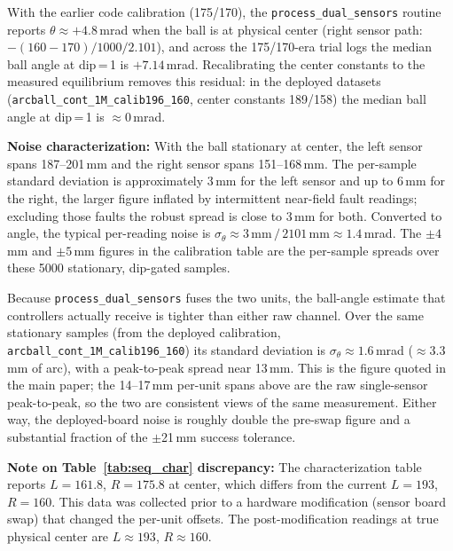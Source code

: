 \noindent
With the earlier code calibration (175/170), the \texttt{process\_dual\_sensors}
routine reports $\theta \approx +4.8$\,mrad when the ball is at physical
center (right sensor path: $-(160-170)/1000/2.101$), and across the
175/170-era trial logs the median ball angle at dip\,=\,1 is $+7.14$\,mrad.
Recalibrating the center constants to the measured equilibrium removes this
residual: in the deployed datasets (\texttt{arcball\_cont\_1M\_calib196\_160},
center constants 189/158) the median ball angle at dip\,=\,1 is
$\approx 0$\,mrad.

\textbf{Noise characterization:}  With the ball stationary at center, the
left sensor spans 187--201\,mm and the right sensor spans
151--168\,mm.  The per-sample standard deviation is
approximately 3\,mm for the left sensor and up to 6\,mm for the right,
the larger figure inflated by intermittent near-field fault readings;
excluding those faults the robust spread is close to 3\,mm for both.
Converted to angle, the typical per-reading noise is
$\sigma_\theta \approx 3\,\text{mm}\, / \,2101\,\text{mm}
\approx 1.4$\,mrad.
The $\pm 4$\,mm and $\pm 5$\,mm figures in the calibration table are the
per-sample spreads over these 5000 stationary, dip-gated samples.

Because \texttt{process\_dual\_sensors} fuses the two units, the ball-angle
estimate that controllers actually receive is tighter than either raw
channel. Over the same stationary samples (from the deployed calibration,
\texttt{arcball\_cont\_1M\_calib196\_160}) its standard deviation is
$\sigma_\theta \approx 1.6$\,mrad ($\approx 3.3$\,mm of arc), with a
peak-to-peak spread near 13\,mm. This is the figure quoted in the main
paper; the 14--17\,mm per-unit spans above are the raw single-sensor
peak-to-peak, so the two are consistent views of the same measurement.
Either way, the deployed-board noise is roughly double the pre-swap
figure and a substantial fraction of the $\pm$21\,mm success tolerance.

\textbf{Note on Table~\ref{tab:seq_char} discrepancy:}
The characterization table reports $L{=}161.8$, $R{=}175.8$ at center,
which differs from the current $L{=}193$, $R{=}160$.  This data was
collected prior to a hardware modification (sensor board swap)
that changed the per-unit offsets.  The post-modification readings
at true physical center are $L\approx 193$, $R\approx 160$.

